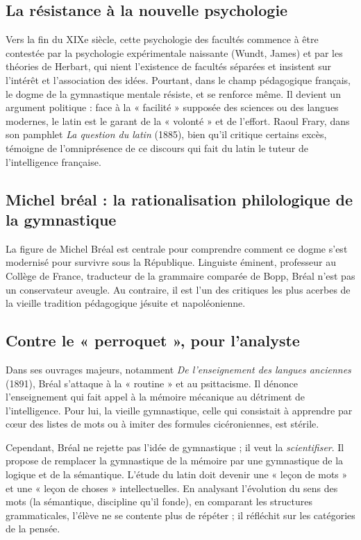 \subsection{La résistance à la nouvelle psychologie}

Vers la fin du XIXe siècle, cette psychologie des facultés commence à être contestée par la
psychologie expérimentale naissante (Wundt, James) et par les théories de Herbart, qui nient
l'existence de facultés séparées et insistent sur l'intérêt et l'association des
idées.\cite{I-1-3-ref3} Pourtant, dans le champ pédagogique français, le dogme de la gymnastique
mentale résiste, et se renforce même. Il devient un argument politique : face à la « facilité »
supposée des sciences ou des langues modernes, le latin est le garant de la « volonté » et de
l'effort. Raoul Frary, dans son pamphlet \textit{La question du latin} (1885), bien qu'il critique
certains excès, témoigne de l'omniprésence de ce discours qui fait du latin le tuteur de
l'intelligence française.\cite{I-1-3-ref5}



\subsection{Michel bréal : la rationalisation philologique de la gymnastique}

La figure de Michel Bréal est centrale pour comprendre comment ce dogme s'est modernisé pour
survivre sous la République. Linguiste éminent, professeur au Collège de France, traducteur de la
grammaire comparée de Bopp, Bréal n'est pas un conservateur aveugle. Au contraire, il est l'un des
critiques les plus acerbes de la vieille tradition pédagogique jésuite et
napoléonienne.\cite{I-1-3-ref7}



\subsection{Contre le « perroquet », pour l'analyste}

Dans ses ouvrages majeurs, notamment \textit{De l'enseignement des langues anciennes} (1891), Bréal
s'attaque à la « routine » et au psittacisme. Il dénonce l'enseignement qui fait appel à la mémoire
mécanique au détriment de l'intelligence. Pour lui, la vieille gymnastique, celle qui consistait à
apprendre par cœur des listes de mots ou à imiter des formules cicéroniennes, est
stérile.\cite{I-1-3-ref9}

Cependant, Bréal ne rejette pas l'idée de gymnastique ; il veut la \textit{scientifiser}. Il propose
de remplacer la gymnastique de la mémoire par une gymnastique de la logique et de la sémantique.
L'étude du latin doit devenir une « leçon de mots » et une « leçon de choses »
intellectuelles.\cite{I-1-3-ref11} En analysant l'évolution du sens des mots (la sémantique,
discipline qu'il fonde), en comparant les structures grammaticales, l'élève ne se contente plus de
répéter ; il réfléchit sur les catégories de la pensée.



